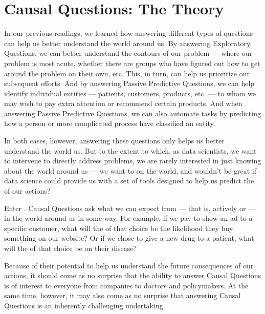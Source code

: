 \documentclass[letterpaper,10pt,english]{jupyterBook}
\begin{document}
\sphinxstepscope


\chapter{Causal Questions: The Theory}
\label{\detokenize{30_questions/30_causal_questions_theory:causal-questions-the-theory}}\label{\detokenize{30_questions/30_causal_questions_theory::doc}}
\sphinxAtStartPar
In our previous readings, we learned how answering different types of questions can help us better understand the world around us. By answering Exploratory Questions, we can better understand the contours of our problem — where our problem is most acute, whether there are groups who have figured out how to get around the problem on their own, etc. This, in turn, can help us prioritize our subsequent efforts. And by answering Passive Predictive Questions, we can help identify individual entities — patients, customers, products, etc. — to whom we may wish to pay extra attention or recommend certain products. And when answering Passive Predictive Questions, we can also automate tasks by predicting how a person or more complicated process  have classified an entity.

\sphinxAtStartPar
In both cases, however, answering these questions only helps us better understand the world  us. But to the extent to which, as data scientists, we want to intervene to directly address problems, we are rarely interested in just knowing about the world around us — we want to  on the world, and wouldn’t be great if data science could provide us with a set of tools designed to help us predict the  of our actions?

\sphinxAtStartPar
Enter . Causal Questions ask what  we can expect from  — that is, actively  or  — in the world around us in some way. For example, if we pay to show an ad to a specific customer, what will the  of that choice be the likelihood they buy something on our website? Or if we chose to give a new drug to a patient, what will the  of that choice be on their disease?

\sphinxAtStartPar
Because of their potential to help us understand the future consequences of our actions, it should come as no surprise that the ability to answer Causal Questions is of  interest to everyone from companies to doctors and policymakers. At the same time, however, it may also come as no surprise that answering Causal Questions is an inherently challenging undertaking.
\end{document}
